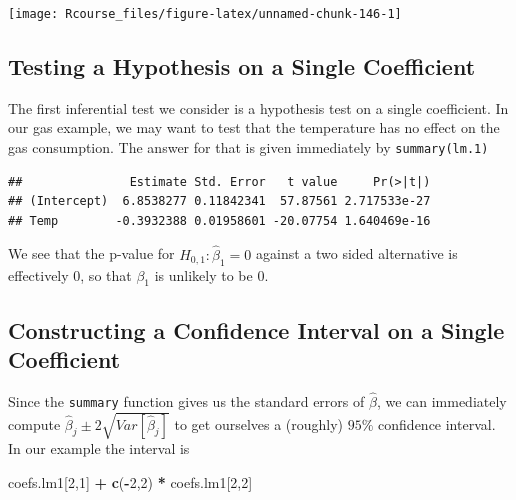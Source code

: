 \documentclass[]{book}
\newenvironment{Shaded}{\begin{snugshade}}{\end{snugshade}}
\newcommand{\KeywordTok}[1]{\textcolor[rgb]{0.13,0.29,0.53}{\textbf{#1}}}
\newcommand{\DecValTok}[1]{\textcolor[rgb]{0.00,0.00,0.81}{#1}}
\newcommand{\StringTok}[1]{\textcolor[rgb]{0.31,0.60,0.02}{#1}}
\newcommand{\OperatorTok}[1]{\textcolor[rgb]{0.81,0.36,0.00}{\textbf{#1}}}
\newcommand{\NormalTok}[1]{#1}
\theoremstyle{definition}
\theoremstyle{definition}
\theoremstyle{definition}
\theoremstyle{remark}
\begin{document}
\texttt{[image: Rcourse\_files/figure-latex/unnamed-chunk-146-1]}

\subsection{Testing a Hypothesis on a Single
Coefficient}\label{testing-a-hypothesis-on-a-single-coefficient}

The first inferential test we consider is a hypothesis test on a single
coefficient. In our gas example, we may want to test that the
temperature has no effect on the gas consumption. The answer for that is
given immediately by \texttt{summary(lm.1)}

\begin{Shaded}
\end{Shaded}

\begin{verbatim}
##               Estimate Std. Error   t value     Pr(>|t|)
## (Intercept)  6.8538277 0.11842341  57.87561 2.717533e-27
## Temp        -0.3932388 0.01958601 -20.07754 1.640469e-16
\end{verbatim}

We see that the p-value for \(H_{0,1}:\hat \beta_1=0\) against a two
sided alternative is effectively 0, so that \(\beta_1\) is unlikely to
be \(0\).

\subsection{Constructing a Confidence Interval on a Single
Coefficient}\label{constructing-a-confidence-interval-on-a-single-coefficient}

Since the \texttt{summary} function gives us the standard errors of
\(\hat \beta\), we can immediately compute
\(\hat \beta_j \pm 2 \sqrt{Var[\hat \beta_j]}\) to get ourselves a
(roughly) \(95\%\) confidence interval. In our example the interval is

\begin{Shaded}
\begin{Highlighting}[]
\NormalTok{coefs.lm1[}\DecValTok{2}\NormalTok{,}\DecValTok{1}\NormalTok{] }\OperatorTok{+}\StringTok{ }\KeywordTok{c}\NormalTok{(}\OperatorTok{-}\DecValTok{2}\NormalTok{,}\DecValTok{2}\NormalTok{) }\OperatorTok{*}\StringTok{ }\NormalTok{coefs.lm1[}\DecValTok{2}\NormalTok{,}\DecValTok{2}\NormalTok{]}
\end{Highlighting}
\end{Shaded}
\end{document}
